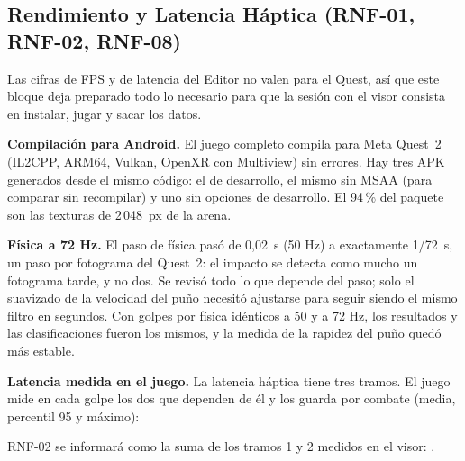 \subsection{Rendimiento y Latencia Háptica (RNF-01, RNF-02, RNF-08)}
\label{sec:rendimiento}
Las cifras de FPS y de latencia del Editor no valen para el Quest, así que este bloque deja preparado todo lo necesario para que la sesión con el visor consista en instalar, jugar y sacar los datos.

\textbf{Compilación para Android.} El juego completo compila para Meta Quest~2 (IL2CPP, ARM64, Vulkan, OpenXR con Multiview) sin errores. Hay tres APK generados desde el mismo código: el de desarrollo, el mismo sin MSAA (para comparar sin recompilar) y uno sin opciones de desarrollo. El 94\,\% del paquete son las texturas de 2\,048~px de la arena.

\textbf{Física a 72 Hz.} El paso de física pasó de 0,02~s (50 Hz) a exactamente 1/72~s, un paso por fotograma del Quest~2: el impacto se detecta como mucho un fotograma tarde, y no dos. Se revisó todo lo que depende del paso; solo el suavizado de la velocidad del puño necesitó ajustarse para seguir siendo el mismo filtro en segundos. Con golpes por física idénticos a 50 y a 72 Hz, los resultados y las clasificaciones fueron los mismos, y la medida de la rapidez del puño quedó más estable.

\textbf{Latencia medida en el juego.} La latencia háptica tiene tres tramos. El juego mide en cada golpe los dos que dependen de él y los guarda por combate (media, percentil 95 y máximo):

\begin{table}[H]
\centering
\caption{Tramos de la latencia háptica.}
\end{table}

RNF-02 se informará como la suma de los tramos 1 y 2 medidos en el visor: .

